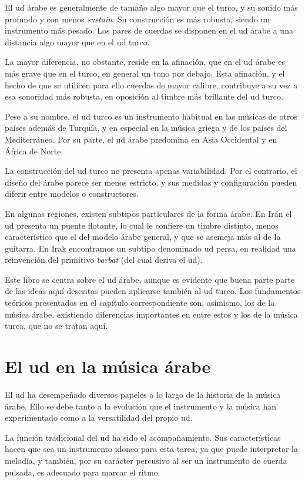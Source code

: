 El ud árabe es generalmente de tamaño algo mayor que el turco, y su sonido más profundo y con menos \emph{sustain}. Su construcción es más robusta, siendo un instrumento más pesado. Los pares de cuerdas se disponen en el ud árabe a una distancia algo mayor que en el ud turco.

La mayor diferencia, no obstante, reside en la afinación, que en el ud árabe es más grave que en el turco, en general un tono por debajo. Esta afinación, y el hecho de que se utilicen para ello cuerdas de mayor calibre, contribuye a su vez a esa sonoridad más robusta, en oposición al timbre más brillante del ud turco.

Pese a su nombre, el ud turco es un instrumento habitual en las músicas de otros países además de Turquía, y en especial en la música griega y de los países del Mediterráneo. Por su parte, el ud árabe predomina en Asia Occidental y en África de Norte.

La construcción del ud turco no presenta apenas variabilidad. Por el contrario, el diseño del árabe parece ser menos estricto, y sus medidas y configuración pueden diferir entre modelos o constructores.

En algunas regiones, existen subtipos particulares de la forma árabe. En Irán el ud presenta un puente flotante, lo cual le confiere un timbre distinto, menos característico que el del modelo árabe general, y que se asemeja más al de la guitarra. En Irak encontramos un subtipo denominado ud persa, en realidad una reinvención del primitivo \emph{barbat} (del cual deriva el ud).

Este libro se centra sobre el ud árabe, aunque es evidente que buena parte parte de las ideas aquí descritas pueden aplicarse también al ud turco. Los fundamentos teóricos presentados en el capítulo correspondiente son, asimismo, los de la música árabe, existiendo diferencias importantes en entre estos y los de la música turca, que no se tratan aquí.

\section{El ud en la música árabe}

El ud ha desempeñado diversos papeles a lo largo de la historia de la música árabe. Ello se debe tanto a la evolución que el instrumento y la música han experimentado como a la versatilidad del propio ud.

La función tradicional del ud ha sido el acompañamiento. Sus características hacen que sea un instrumento idoneo para esta tarea, ya que puede interpretar la melodía, y también, por su carácter percusivo al ser un instrumento de cuerda pulsada, es adecuado para marcar el ritmo.

